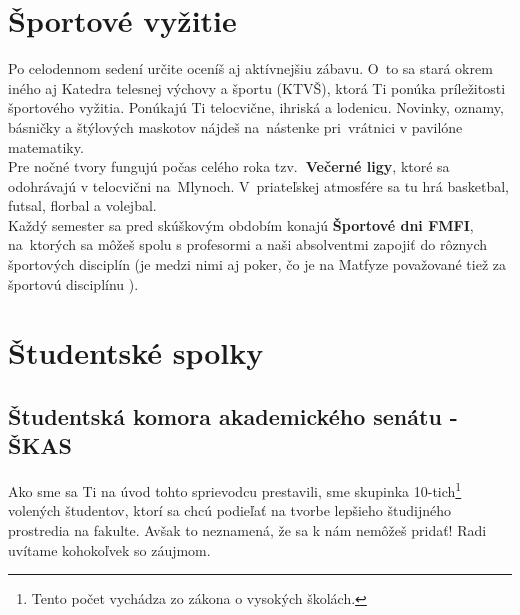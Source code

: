 

\section{Športové vyžitie}

Po celodennom sedení určite oceníš aj aktívnejšiu zábavu. O~to sa
stará okrem iného aj Katedra telesnej výchovy a športu (KTVŠ), ktorá
Ti ponúka príležitosti športového vyžitia. Ponúkajú Ti telocvične,
ihriská a lodenicu. Novinky, oznamy, básničky a štýlových maskotov
nájdeš na~nástenke pri~vrátnici v pavilóne matematiky. \\

Pre nočné tvory fungujú počas celého roka tzv.\textbf{\ Večerné ligy},
ktoré sa odohrávajú v telocvični na~Mlynoch. V~priateľskej atmosfére
sa tu hrá basketbal, futsal, florbal a volejbal. \\

Každý semester sa pred skúškovým obdobím konajú \textbf{Športové dni
FMFI}, na~ktorých sa môžeš spolu s profesormi a naši absolventmi zapojiť 
do rôznych športových disciplín (je medzi nimi aj poker, čo je na Matfyze považované tiež za športovú disciplínu \Smiley{}).

\section{Študentské spolky}

\subsection{Študentská komora akademického senátu - ŠKAS}

Ako sme sa Ti na úvod tohto sprievodcu prestavili, sme skupinka 10-tich\footnote{Tento počet vychádza zo zákona o vysokých školách.} volených študentov, ktorí sa chcú podieľať na tvorbe lepšieho študijného prostredia na fakulte. Avšak to neznamená, že sa k nám nemôžeš pridať! Radi uvítame kohokoľvek so záujmom. 

